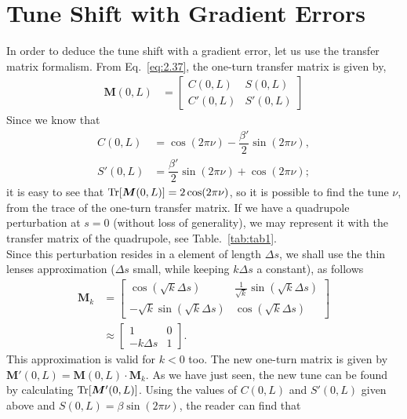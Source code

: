 \documentclass[../sands-adaptation.tex]{subfiles}
\begin{document}
\section{Tune Shift with Gradient Errors}\label{sec:dtune_grad_err}

In order to deduce the tune shift with a gradient error, let us use the transfer matrix formalism. From Eq.~\eqref{eq:2.37}, the one-turn transfer matrix is given by,
\begin{align*}
	\boldsymbol{M}(0,L)
    &= \begin{bmatrix}
	C(0,L) & S(0,L)\\
	C'(0,L) & S'(0,L)
	\end{bmatrix}
\end{align*}
 Since we know that
\begin{align*}
	C(0,L) &= \cos(2\pi\nu) - \dfrac{\beta'}{2} \sin(2\pi\nu),\\
    S'(0,L) &= \dfrac{\beta'}{2} \sin(2\pi\nu) + \cos(2\pi\nu);
\end{align*}
it is easy to see that $\operatorname{Tr} [\boldsymbol{M}(0,L)] = 2\cos(2\pi\nu)$, so it is possible to find the tune $\nu$, from the trace of the one-turn transfer matrix.
If we have a quadrupole perturbation at $s=0$ (without loss of generality), we may represent it with the transfer matrix of the quadrupole, see Table.~\ref{tab:tab1}.\\
Since this perturbation resides in a element of length $\Delta s$, we shall use the thin lenses approximation ($\Delta s$ small, while keeping $k\Delta s$ a constant), as follows
\begin{align}
	\boldsymbol{M}_k &=
	\begin{bmatrix}
			\cos(\sqrt{k}\Delta s) & \frac{1}{\sqrt{k}}\sin(\sqrt{k}\Delta s)\\
			-\sqrt{k}\sin(\sqrt{k}\Delta s) & \cos(\sqrt{k}\Delta s)
	\end{bmatrix}\\
    & \approx
    \begin{bmatrix}
			1 & 0\\
			-k \Delta s & 1
	\end{bmatrix}.
\end{align}
This approximation is valid for $k < 0$ too. The new one-turn matrix is given by $\boldsymbol{M}'(0,L) = \boldsymbol{M}(0,L) \cdot \boldsymbol{M}_k$. As we have just seen, the new tune can be found by calculating $\operatorname{Tr}[\boldsymbol{M}'(0,L)]$. Using the values of $C(0,L)$ and $S'(0,L)$ given above and $S(0,L) = \beta \sin(2\pi\nu)$, the reader can find that
\end{document}
